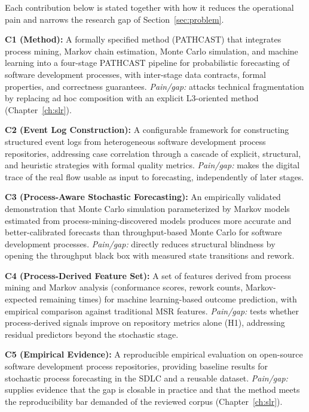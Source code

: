Each contribution below is stated together with how it reduces the
operational pain and narrows the research gap of Section~\ref{sec:problem}.

\textbf{C1 (Method):} A formally specified method (PATHCAST) that
integrates process mining, Markov chain estimation, Monte Carlo
simulation, and machine learning into a four-stage PATHCAST pipeline for
probabilistic forecasting of software development processes, with
inter-stage data contracts, formal properties, and correctness guarantees.
\emph{Pain/gap:} attacks technical fragmentation by replacing ad hoc
composition with an explicit L3-oriented method (Chapter~\ref{ch:slr}).

\textbf{C2 (Event Log Construction):} A configurable framework for
constructing structured event logs from heterogeneous software development
process repositories, addressing case correlation through a cascade of
explicit, structural, and heuristic strategies with formal quality
metrics.
\emph{Pain/gap:} makes the digital trace of the real flow usable as
input to forecasting, independently of later stages.

\textbf{C3 (Process-Aware Stochastic Forecasting):} An empirically
validated demonstration that Monte Carlo simulation parameterized by
Markov models estimated from process-mining-discovered models produces
more accurate and better-calibrated forecasts than throughput-based Monte
Carlo for software development processes.
\emph{Pain/gap:} directly reduces structural blindness by opening the
throughput black box with measured state transitions and rework.

\textbf{C4 (Process-Derived Feature Set):} A set of features derived from
process mining and Markov analysis (conformance scores, rework counts,
Markov-expected remaining times) for machine learning-based outcome
prediction, with empirical comparison against traditional MSR features.
\emph{Pain/gap:} tests whether process-derived signals improve on
repository metrics alone (H1), addressing residual predictors beyond the
stochastic stage.

\textbf{C5 (Empirical Evidence):} A reproducible empirical evaluation on
open-source software development process repositories, providing baseline results for
stochastic process forecasting in the SDLC and a reusable dataset.
\emph{Pain/gap:} supplies evidence that the gap is closable in practice
and that the method meets the reproducibility bar demanded of the
reviewed corpus (Chapter~\ref{ch:slr}).


